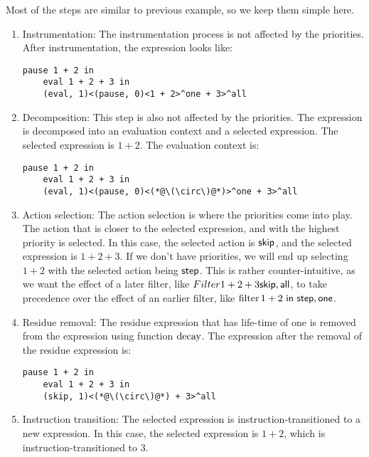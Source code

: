 Most of the steps are similar to previous example, so we keep them simple here.
\begin{enumerate}
  \item\label{agl:priority-example-instr} Instrumentation: The instrumentation process is not affected by the priorities. After instrumentation, the expression looks like:
  \begin{lstlisting}[language=hazel]
    pause 1 + 2 in
    eval 1 + 2 + 3 in
    (eval, 1)<(pause, 0)<1 + 2>^one + 3>^all
  \end{lstlisting}

  \item Decomposition: This step is also not affected by the priorities. The expression is decomposed into an evaluation context and a selected expression. The selected expression is \(1 + 2\). The evaluation context is:
  \begin{lstlisting}[language=hazel]
    pause 1 + 2 in
    eval 1 + 2 + 3 in
    (eval, 1)<(pause, 0)<(*@\(\circ\)@*)>^one + 3>^all
  \end{lstlisting}

  \item Action selection: The action selection is where the priorities come into play. The action that is closer to the selected expression, and with the highest priority is selected. In this case, the selected action is \(\mathsf{skip}\), and the selected expression is \(1 + 2 + 3\). If we don't have priorities, we will end up selecting \(1 + 2\) with the selected action being \(\mathsf{step}\). This is rather counter-intuitive, as we want the effect of a later filter, like \(Filter{1 + 2 + 3}{\mathsf{skip}, \mathsf{all}}\), to take precedence over the effect of an earlier filter, like \(\operatorname{filter} 1 + 2 ~\mathsf{in}~ \mathsf{step}, \mathsf{one}\).

  \item Residue removal: The residue expression that has life-time of one is removed from the expression using function \(\operatorname{decay}\). The expression after the removal of the residue expression is:
  \begin{lstlisting}[language=hazel]
    pause 1 + 2 in
    eval 1 + 2 + 3 in
    (skip, 1)<(*@\(\circ\)@*) + 3>^all
  \end{lstlisting}

  \item Instruction transition: The selected expression is instruction-transitioned to a new expression. In this case, the selected expression is \(1 + 2\), which is instruction-transitioned to \(3\).


\end{enumerate}
